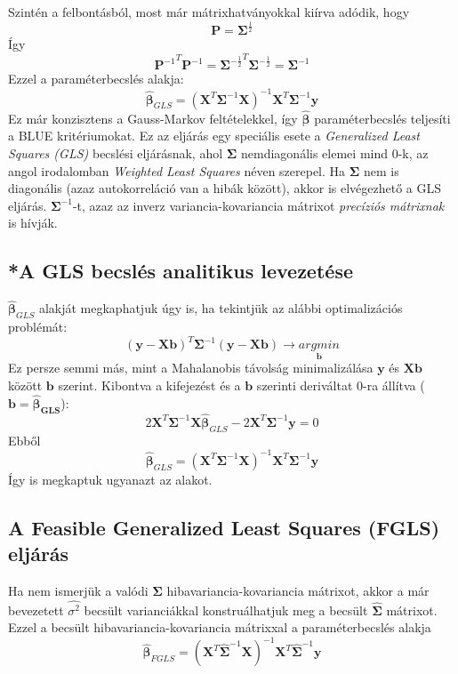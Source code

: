 \documentclass[14p]{report}
\def\pmb{\boldsymbol}
\def\ebeta{\hat{\pmb{\beta}}}
\begin{document}
	Szintén a felbontásból, most már mátrixhatványokkal kiírva adódik, hogy
	\[
		\pmb{P} = \pmb{\Sigma}^{\frac{1}{2}}
	\]
	Így
	\[
		{\pmb{P}^{-1}}^T\pmb{P}^{-1} = {\pmb{\Sigma}^{-\frac{1}{2}}}^T\pmb{\Sigma}^{-\frac{1}{2}} = \pmb{\Sigma}^{-1}
	\]
	Ezzel a paraméterbecslés alakja:
	\[
		\ebeta_{GLS} = (\pmb{X}^T\pmb{\Sigma}^{-1}\pmb{X})^{-1}\pmb{X}^T\pmb{\Sigma}^{-1}\pmb{y}
	\]
	Ez már konzisztens a Gauss-Markov feltételekkel, így $\ebeta$ paraméterbecslés teljesíti a BLUE kritériumokat. Ez az eljárás egy speciális esete a \emph{Generalized Least Squares (GLS)} becslési eljárásnak, ahol $\pmb{\Sigma}$ nemdiagonális elemei mind $0$-k, az angol irodalomban \emph{Weighted Least Squares} néven szerepel. Ha $\pmb{\Sigma}$ nem is diagonális (azaz autokorreláció van a hibák között), akkor is elvégezhető a GLS eljárás. $\pmb{\Sigma}^{-1}$-t, azaz az inverz variancia-kovariancia mátrixot \emph{precíziós mátrixnak} is hívják.
	\subsection{*A GLS becslés analitikus levezetése}
	$\ebeta_{GLS}$ alakját megkaphatjuk úgy is, ha tekintjük az alábbi optimalizációs problémát:
	\[
		(\pmb{y} - \pmb{X}\pmb{b})^T\pmb{\Sigma}^{-1}(\pmb{y} - \pmb{X}\pmb{b}) \rightarrow \underset{\pmb{b}}{argmin}
	\]
	Ez persze semmi más, mint a Mahalanobis távolság minimalizálása $\pmb{y}$ és $\pmb{X}\pmb{b}$ között $\pmb{b}$ szerint. Kibontva a kifejezést és a $\pmb{b}$ szerinti deriváltat $0$-ra állítva ($\pmb{b} = \pmb{\ebeta_{GLS}}$):
	\[
		2\pmb{X}^T\pmb{\Sigma}^{-1}\pmb{X}\ebeta_{GLS} - 2\pmb{X}^T\pmb{\Sigma}^{-1}\pmb{y} = 0
	\]
	Ebből
	\[
		\ebeta_{GLS} = (\pmb{X}^T\pmb{\Sigma}^{-1}\pmb{X})^{-1}\pmb{X}^T\pmb{\Sigma}^{-1}\pmb{y}
	\]
	Így is megkaptuk ugyanazt az alakot.
	\subsection{A Feasible Generalized Least Squares (FGLS) eljárás}
	Ha nem ismerjük a valódi $\pmb{\Sigma}$ hibavariancia-kovariancia mátrixot, akkor a már bevezetett $\widehat{\sigma^2}$ becsült varianciákkal konstruálhatjuk meg a becsült $\widehat{\pmb{\Sigma}}$ mátrixot. Ezzel a becsült hibavariancia-kovariancia mátrixxal a paraméterbecslés alakja
	\[
		\ebeta_{FGLS} = (\pmb{X}^T\widehat{\pmb{\Sigma}}^{-1}\pmb{X})^{-1}\pmb{X}^T\widehat{\pmb{\Sigma}}^{-1}\pmb{y}
	\]
\end{document}
